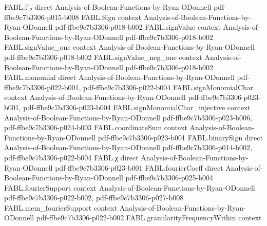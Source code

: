 \begin{theorem}
\label{FABL.biasedMinusProbability_majority_lower_le_two_mul_exp}
\leanok
{}
\proofstep
  {FABL.𝔽₂}
  {direct}
  {Analysis-of-Boolean-Functions-by-Ryan-ODonnell}
  {pdf-ffbe9c7b3306-p015-b008}
\proofstep
  {FABL.Sign}
  {context}
  {Analysis-of-Boolean-Functions-by-Ryan-ODonnell}
  {pdf-ffbe9c7b3306-p018-b002}
\proofstep
  {FABL.signValue}
  {context}
  {Analysis-of-Boolean-Functions-by-Ryan-ODonnell}
  {pdf-ffbe9c7b3306-p018-b002}
\proofstep
  {FABL.signValue_one}
  {context}
  {Analysis-of-Boolean-Functions-by-Ryan-ODonnell}
  {pdf-ffbe9c7b3306-p018-b002}
\proofstep
  {FABL.signValue_neg_one}
  {context}
  {Analysis-of-Boolean-Functions-by-Ryan-ODonnell}
  {pdf-ffbe9c7b3306-p018-b002}
\proofstep
  {FABL.monomial}
  {direct}
  {Analysis-of-Boolean-Functions-by-Ryan-ODonnell}
  {pdf-ffbe9c7b3306-p022-b001,
    pdf-ffbe9c7b3306-p022-b004}
\proofstep
  {FABL.signMonomialChar}
  {context}
  {Analysis-of-Boolean-Functions-by-Ryan-ODonnell}
  {pdf-ffbe9c7b3306-p023-b001,
    pdf-ffbe9c7b3306-p023-b004}
\proofstep
  {FABL.signMonomialChar_injective}
  {context}
  {Analysis-of-Boolean-Functions-by-Ryan-ODonnell}
  {pdf-ffbe9c7b3306-p023-b006,
    pdf-ffbe9c7b3306-p024-b003}
\proofstep
  {FABL.coordinateSum}
  {context}
  {Analysis-of-Boolean-Functions-by-Ryan-ODonnell}
  {pdf-ffbe9c7b3306-p023-b001}
\proofstep
  {FABL.binarySign}
  {direct}
  {Analysis-of-Boolean-Functions-by-Ryan-ODonnell}
  {pdf-ffbe9c7b3306-p014-b002,
    pdf-ffbe9c7b3306-p022-b004}
\proofstep
  {FABL.χ}
  {direct}
  {Analysis-of-Boolean-Functions-by-Ryan-ODonnell}
  {pdf-ffbe9c7b3306-p023-b001}
\proofstep
  {FABL.fourierCoeff}
  {direct}
  {Analysis-of-Boolean-Functions-by-Ryan-ODonnell}
  {pdf-ffbe9c7b3306-p025-b004}
\proofstep
  {FABL.fourierSupport}
  {context}
  {Analysis-of-Boolean-Functions-by-Ryan-ODonnell}
  {pdf-ffbe9c7b3306-p022-b002,
    pdf-ffbe9c7b3306-p027-b008}
\proofstep
  {FABL.mem_fourierSupport}
  {context}
  {Analysis-of-Boolean-Functions-by-Ryan-ODonnell}
  {pdf-ffbe9c7b3306-p022-b002}
\proofstep
  {FABL.granularityFrequencyWithin}
  {context}

\end{theorem}
